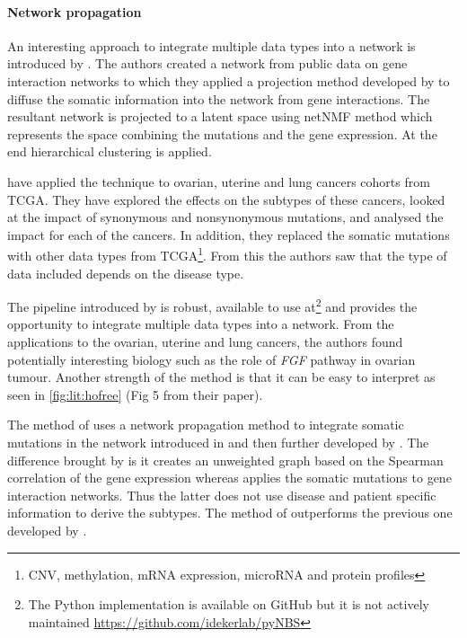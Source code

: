 \paragraph*{Network propagation} \label{s:lit:net_prop}

An interesting approach to integrate multiple data types into a network is introduced by  \citet{Hofree2013-ld}. The authors created a network from public data on gene interaction networks \cite{Szklarczyk2019-pu, Cerami2011-ql, Lee2011-xj} to which they applied a projection method developed by \citet{Vanunu2010-el} to diffuse the somatic information into the network from gene interactions. The resultant network is projected to a latent space using netNMF method \citet{Cai2008-fv} which represents the space combining the mutations and the gene expression. At the end hierarchical clustering is applied.

\citet{Hofree2013-ld} have applied the technique to ovarian, uterine and lung cancers cohorts from TCGA. They have explored the effects on the subtypes of these cancers, looked at the impact of synonymous and nonsynonymous mutations, and analysed the impact for each of the cancers. In addition, they replaced the somatic mutations with other data types from TCGA\footnote{CNV, methylation, mRNA expression, microRNA and protein profiles}. From this the authors saw that the type of data included depends on the disease type.

The pipeline introduced by \citet{Hofree2013-ld} is robust, available to use at\footnote{The Python implementation is available on GitHub but it is not actively maintained \url{https://github.com/idekerlab/pyNBS}} and provides the opportunity to integrate multiple data types into a network. From the applications to the ovarian, uterine and lung cancers, the authors found potentially interesting biology such as the role of \textit{FGF} pathway in ovarian tumour. Another strength of the method is that it can be easy to interpret as seen in \cref{fig:lit:hofree} (Fig 5 from their paper).

The method of \citet{He2017-dj} uses a network propagation method to integrate somatic mutations in the network introduced in \citet{Vanunu2010-el} and then further developed by \citet{Hofree2013-ld}. The difference brought by \citet{He2017-dj} is it creates an unweighted graph based on the Spearman correlation of the gene expression whereas \citet{Hofree2013-ld} applies the somatic mutations to gene interaction networks. Thus the latter does not use disease and patient specific information to derive the subtypes. The method of \citet{He2017-dj} outperforms the previous one developed by \citet{Hofree2013-ld}.

